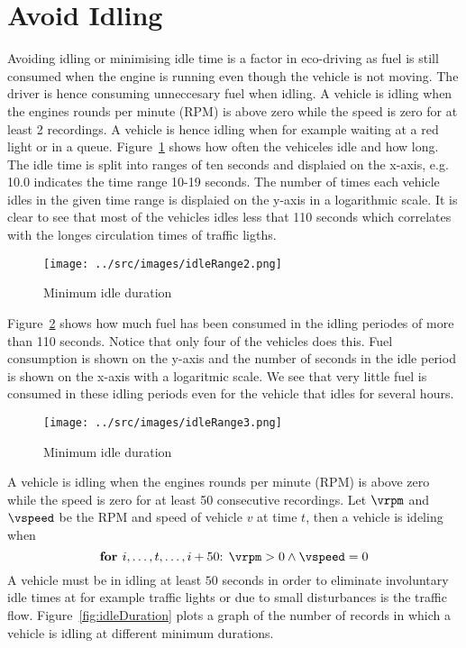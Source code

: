\section{Avoid Idling}

Avoiding idling or minimising idle time is a factor in eco-driving as fuel is still consumed when the engine is running even though the vehicle is not moving.
The driver is hence consuming unneccesary fuel when idling.
A vehicle is idling when the engines rounds per minute (RPM) is above zero while the speed is zero for at least 2 recordings.
A vehicle is hence idling when for example waiting at a red light or in a queue. 
Figure~\ref{fig:idleRange2} shows how often the vehiceles idle and how long.
The idle time is split into ranges of ten seconds and displaied on the x-axis, e.g. 10.0 indicates the time range 10-19 seconds. 
The number of times each vehicle idles in the given time range is displaied on the y-axis in a logarithmic scale. 
It is clear to see that most of the vehicles idles less that 110 seconds which correlates with the longes circulation times of traffic ligths. 
\begin{figure}[htb]
\centering
\texttt{[image: ../src/images/idleRange2.png]}
\caption{Minimum idle duration}
\label{fig:idleRange2}
\end{figure}

Figure~\ref{fig:idleRange3} shows how much fuel has been consumed in the idling periodes of more than 110 seconds. 
Notice that only four of the vehicles does this.
Fuel consumption is shown on the y-axis and the number of seconds in the idle period is shown on the x-axis with a logaritmic scale.
We see that very little fuel is consumed in these idling periods even for the vehicle that idles for several hours.

\begin{figure}[htb]
\centering
\texttt{[image: ../src/images/idleRange3.png]}
\caption{Minimum idle duration}
\label{fig:idleRange3}
\end{figure}



A vehicle is idling when the engines rounds per minute (RPM) is above zero while the speed is zero for at least 50 consecutive recordings. %
Let $\vrpm$ and $\vspeed$ be the RPM and speed of vehicle $v$ at time $t$, then a vehicle is ideling when
\[\mbox{\textbf{for }} i, \dots ,t, \dots, i+50 \mbox{: }\vrpm> 0 \wedge \vspeed=0 \]
A vehicle must be in idling at least $50$ seconds in order to eliminate involuntary idle times at for example traffic lights or due to small disturbances is the traffic flow.
Figure~\ref{fig:idleDuration} plots a graph of the number of records in which a vehicle is idling at different minimum durations. 

